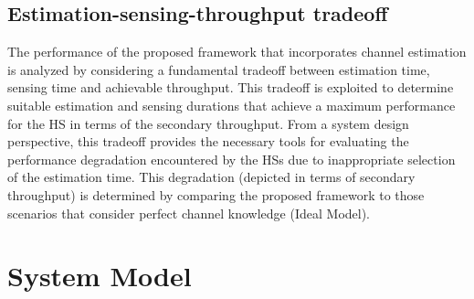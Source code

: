 \subsection{Estimation-sensing-throughput tradeoff}
The performance of the proposed framework that incorporates channel estimation is analyzed by considering a fundamental tradeoff between estimation time, sensing time and achievable throughput. This tradeoff is exploited to determine suitable estimation and sensing durations that achieve a maximum performance for the HS in terms of the secondary throughput. From a system design perspective, this tradeoff provides the necessary tools for evaluating the performance degradation encountered by the HSs due to inappropriate selection of the estimation time. This degradation (depicted in terms of secondary throughput) is determined by comparing the proposed framework to those scenarios that consider perfect channel knowledge (Ideal Model).  

\section{System Model} \label{sec:sys_mod}
